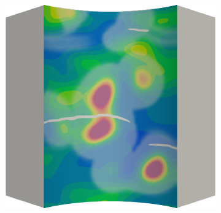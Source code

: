 \begin{frame}
\begin{columns}[T]
\begin{column}{0.6\textwidth}
\begin{figure}
{\begin{subfigure}{0.19\textwidth}
          \end{subfigure}
          \hspace{0.06\textwidth}
          \begin{subfigure}{0.19\textwidth}
            \centering
            \includegraphics[width=\textwidth]{Chapter345/figures/ep.0027}
          \end{subfigure}
        }
        

\end{figure}
\end{column}
\end{columns}
\end{frame}
